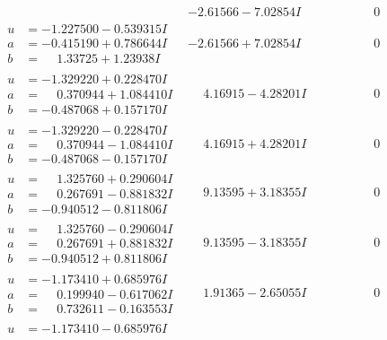 \documentclass[1p]{elsarticle_modified}
\theoremstyle{definition}
\begin{document}
$$\begin{array}{c|c|c}
 & -2.61566 - 7.02854 I & \phantom{-0.000000 } 0 \\ \hline\begin{aligned}
u &= -1.227500 - 0.539315 I \\
a &= -0.415190 + 0.786644 I \\
b &= \phantom{-}1.33725 + 1.23938 I\end{aligned}
 & -2.61566 + 7.02854 I & \phantom{-0.000000 } 0 \\ \hline\begin{aligned}
u &= -1.329220 + 0.228470 I \\
a &= \phantom{-}0.370944 + 1.084410 I \\
b &= -0.487068 + 0.157170 I\end{aligned}
 & \phantom{-}4.16915 - 4.28201 I & \phantom{-0.000000 } 0 \\ \hline\begin{aligned}
u &= -1.329220 - 0.228470 I \\
a &= \phantom{-}0.370944 - 1.084410 I \\
b &= -0.487068 - 0.157170 I\end{aligned}
 & \phantom{-}4.16915 + 4.28201 I & \phantom{-0.000000 } 0 \\ \hline\begin{aligned}
u &= \phantom{-}1.325760 + 0.290604 I \\
a &= \phantom{-}0.267691 - 0.881832 I \\
b &= -0.940512 - 0.811806 I\end{aligned}
 & \phantom{-}9.13595 + 3.18355 I & \phantom{-0.000000 } 0 \\ \hline\begin{aligned}
u &= \phantom{-}1.325760 - 0.290604 I \\
a &= \phantom{-}0.267691 + 0.881832 I \\
b &= -0.940512 + 0.811806 I\end{aligned}
 & \phantom{-}9.13595 - 3.18355 I & \phantom{-0.000000 } 0 \\ \hline\begin{aligned}
u &= -1.173410 + 0.685976 I \\
a &= \phantom{-}0.199940 - 0.617062 I \\
b &= \phantom{-}0.732611 - 0.163553 I\end{aligned}
 & \phantom{-}1.91365 - 2.65055 I & \phantom{-0.000000 } 0 \\ \hline\begin{aligned}
u &= -1.173410 - 0.685976 I \\

\end{aligned}
\end{array}$$
\end{document}

